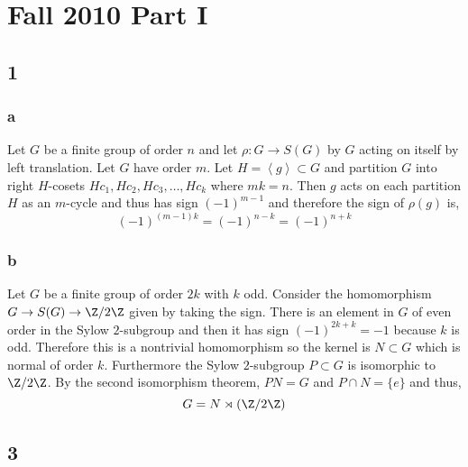 \documentclass[12pt]{article}
\begin{document}
\section{Fall 2010 Part I}

\subsection{1}

\subsubsection{a}

Let $G$ be a finite group of order $n$ and let $\rho : G \to S(G)$ by $G$ acting on itself by left translation. Let $G$ have order $m$. Let $H = \left< g \right> \subset G$ and partition $G$ into right $H$-cosets $H c_1, H c_2, H c_3, \dots, H c_{k}$ where $mk = n$. Then $g$ acts on each partition $H$ as an $m$-cycle and thus has sign $(-1)^{m-1}$ and therefore the sign of $\rho(g)$ is,
\[ (-1)^{(m-1)k} = (-1)^{n - k} = (-1)^{n + k} \]

\subsubsection{b}

Let $G$ be a finite group of order $2k$ with $k$ odd. Consider the homomorphism $G \to S(G) \to \Z / 2 \Z$ given by taking the sign. There is an element in $G$ of even order in the Sylow $2$-subgroup and then it has sign $(-1)^{2k + k} = -1$ because $k$ is odd. Therefore this is a nontrivial homomorphism so the kernel is $N \subset G$ which is normal of order $k$. Furthermore the Sylow $2$-subgroup $P \subset G$ is isomorphic to $\Z / 2 \Z$. By the second isomorphism theorem, $PN = G$ and $P \cap N = \{ e \}$ and thus,
\[ G = N \rtimes (\Z / 2 \Z) \]

\subsection{3}
\end{document}
